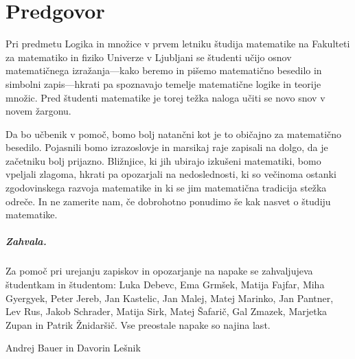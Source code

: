 \chapter*{Predgovor}

Pri predmetu Logika in množice v prvem letniku študija matematike na Fakulteti za matematiko in fiziko Univerze v Ljubljani se študenti učijo osnov matematičnega izražanja---kako beremo in pišemo matematično besedilo in simbolni zapis---hkrati pa spoznavajo temelje matematične logike in teorije množic.
%
Pred študenti matematike je torej težka naloga učiti se novo snov v novem žargonu.

Da bo učbenik v pomoč, bomo bolj natančni kot je to običajno za matematično besedilo.
Pojasnili bomo izrazoslovje in marsikaj raje zapisali na dolgo, da je začetniku bolj prijazno.
%
Bližnjice, ki jih ubirajo izkušeni matematiki, bomo vpeljali zlagoma, hkrati pa opozarjali na nedoslednosti, ki so
večinoma ostanki zgodovinskega razvoja matematike in ki se jim matematična tradicija stežka odreče.
%
In ne zamerite nam, če dobrohotno ponudimo še kak nasvet o študiju matematike.


\paragraph{Zahvala.}
%
Za pomoč pri urejanju zapiskov in opozarjanje na napake se zahvaljujeva študentkam in študentom:
%
Luka Debevc,
Ema Grmšek,
Matija Fajfar,
Miha Gyergyek,
Peter Jereb,
Jan Kastelic,
Jan Malej,
Matej Marinko,
Jan Pantner,
Lev Rus,
Jakob Schrader,
Matija Sirk,
Matej Šafarič,
Gal Zmazek,
Marjetka Zupan in Patrik Žnidaršič.
%
Vse preostale napake so najina last.
\bigskip

\begin{flushright}
Andrej Bauer in Davorin Lešnik
\end{flushright}

\bigskip


